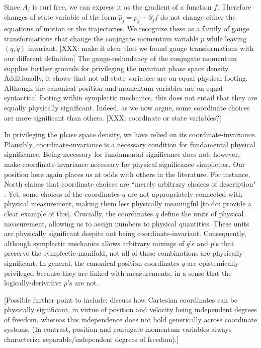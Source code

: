 \documentclass[letterpaper]{article}
\begin{document}
Since $A_j$ is curl free, we can express it as the gradient of a function $f$. Therefore changes of state variable of the form $\hat{p}_j = p_j + \partial_j f$ do not change either the equations of motion or the trajectories. We recognize these as a family of gauge transformations that change the conjugate momentum variable $p$ while leaving $(q,\dot{q}) $ invariant. [XXX: make it clear that we found gauge transformations with our different definition] The gauge-redundancy of the conjugate momentum supplies further grounds for privileging the invariant phase space density. Additionally, it shows that not all state variables are on equal physical footing. Although the canonical position and momentum variables are on equal syntactical footing within symplectic mechanics, this does not entail that they are equally physically significant. Indeed, as we now argue, some coordinate choices are more significant than others. [XXX: coordinate or state variables?]

In privileging the phase space density, we have relied on its coordinate-invariance. Plausibly, coordinate-invariance is a necessary condition for fundamental physical significance. Being necessary for fundamental significance does not, however, make coordinate-invariance necessary for physical significance simpliciter. Our position here again places us at odds with others in the literature. For instance, North claims that coordinate choices are ``merely arbitrary choices of description" \parencites*[61]{North}. Yet, some choices of the coordinates $q$ are not appropriately connected with physical measurement, making them less physically meaningful [to do: provide a clear example of this]. Crucially, the coordinates $q$ define the units of physical measurement, allowing us to assign numbers to physical quantities. These units are physically significant despite not being coordinate-invariant. Consequently, although symplectic mechanics allows arbitrary mixings of $q$'s and $p$'s that preserve the symplectic manifold, not all of these combinations are physically significant. In general, the canonical position coordinates $q$ are epistemically privileged because they are linked with measurements, in a sense that the logically-derivative  $p$'s are not. 

[Possible further point to include: discuss how Cartesian coordinates can be physically significant, in virtue of position and velocity being independent degrees of freedom, whereas this independence does not hold generically across coordinate systems. (In contrast, position and conjugate momentum variables always characterize separable/independent degrees of freedom).]
\end{document}
